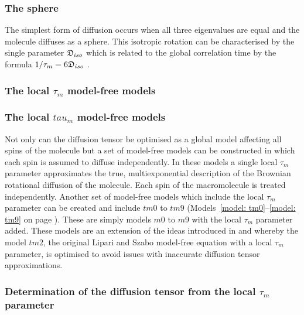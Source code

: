\begin{htmlonly}
\begin{htmlonly}
\subsubsection{The sphere}

The simplest form of diffusion occurs when all three eigenvalues are equal and the molecule diffuses as a sphere.  This isotropic rotation can be characterised by the single parameter $\mathfrak{D}_{iso}$ which is related to the global correlation time by the formula $1/\tau_m = 6\mathfrak{D}_{iso}$ \citep{Bloembergen48}.


\begin{latexonly}
    \subsubsection{The local $\tau_m$ model-free models}
\end{latexonly}
\begin{htmlonly}
    \subsubsection{The local $tau_m$ model-free models}
\end{htmlonly}

Not only can the diffusion tensor be optimised as a global model affecting all spins of the molecule but a set of model-free models can be constructed in which each spin is assumed to diffuse independently.  In these models a single local $\tau_m$ parameter approximates the true, multiexponential description of the Brownian rotational diffusion of the molecule.  Each spin of the macromolecule is treated independently.  Another set of model-free models which include the local $\tau_m$ parameter can be created and include $tm0$ to $tm9$ (Models~\ref{model: tm0}--\ref{model: tm9} on page \pageref{model: tm0}).  These are simply models $m0$ to $m9$ with the local $\tau_m$ parameter added.  These models are an extension of the ideas introduced in \citet{Barbato92} and \citet{Schurr94} whereby the model $tm2$, the original Lipari and Szabo model-free equation with a local $\tau_m$ parameter, is optimised to avoid issues with inaccurate diffusion tensor approximations.


\begin{latexonly}
    \subsubsection{Determination of the diffusion tensor from the local $\tau_m$ parameter}
\end{latexonly}
\begin{htmlonly}

\end{htmlonly}
\end{htmlonly}
\end{htmlonly}
